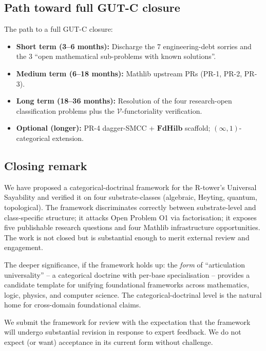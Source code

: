 \documentclass[11pt,a4paper]{article}
\theoremstyle{plain}
\theoremstyle{definition}
\theoremstyle{remark}
\newcommand{\cat}[1]{\mathbf{#1}}
\newcommand{\FdHilb}{\cat{FdHilb}}
\newcommand{\smcc}{SMCC}
\begin{document}
\subsection{Path toward full GUT-C closure}\label{sec:concl:path}

The path to a full GUT-C closure:

\begin{itemize}[leftmargin=*]
\item \textbf{Short term (3--6 months):} Discharge the 7 engineering-debt sorries and the 3 ``open mathematical sub-problems with known solutions''.
\item \textbf{Medium term (6--18 months):} Mathlib upstream PRs (PR-1, PR-2, PR-3).
\item \textbf{Long term (18--36 months):} Resolution of the four research-open classification problems plus the $\mathcal{V}$-functoriality verification.
\item \textbf{Optional (longer):} PR-4 dagger-\smcc{} + $\FdHilb$ scaffold; $(\infty, 1)$-categorical extension.
\end{itemize}

\subsection{Closing remark}\label{sec:concl:closing}

We have proposed a categorical-doctrinal framework for the R-tower's Universal Sayability and verified it on four substrate-classes (algebraic, Heyting, quantum, topological). The framework discriminates correctly between substrate-level and class-specific structure; it attacks Open Problem O1 via factorisation; it exposes five publishable research questions and four Mathlib infrastructure opportunities. The work is not closed but is substantial enough to merit external review and engagement.

The deeper significance, if the framework holds up: the \emph{form} of ``articulation universality'' -- a categorical doctrine with per-base specialisation -- provides a candidate template for unifying foundational frameworks across mathematics, logic, physics, and computer science. The categorical-doctrinal level is the natural home for cross-domain foundational claims.

We submit the framework for review with the expectation that the framework will undergo substantial revision in response to expert feedback. We do not expect (or want) acceptance in its current form without challenge.
\end{document}
